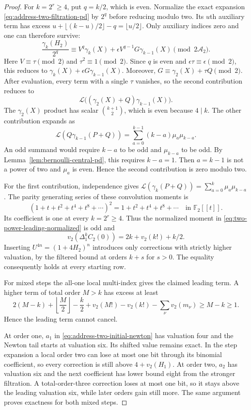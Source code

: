 \begin{proof}
For $k=2^r\geq4$, put $q=k/2$, which is even. Normalize the exact
expansion \eqref{eq:address-two-filtration-pd} by $2^q$ before reducing
modulo two. Its $u$th auxiliary term has excess
$u+\lfloor(k-u)/2\rfloor-q=\lfloor u/2\rfloor$.
Only auxiliary indices zero and one can therefore survive:
\begin{equation}
 \frac{\gamma_k(H_2)}{2^q}
 \equiv V^q\gamma_k(X)
       +\epsilon V^{q-1}G\gamma_{k-1}(X)
                                \pmod{2\mathcal A_2}.
 \label{eq:two-power-leading-normalized}
\end{equation}
Here $V\equiv\tau\pmod2$ and $\tau^2\equiv1\pmod2$.
Since $q$ is even and $\epsilon\tau\equiv\epsilon\pmod2$, this reduces
to $\gamma_k(X)+\epsilon G\gamma_{k-1}(X)$.
Moreover, $G\equiv\gamma_2(X)+\tau Q\pmod2$.
After evaluation, every term with a single $\tau$ vanishes, so the
second contribution reduces to
\[
 \mathcal L\bigl((\gamma_2(X)+Q)\gamma_{k-1}(X)\bigr).
\]
The $\gamma_2(X)$ product has scalar $\binom{k+1}{2}$, which is even
because $4\mid k$. The other contribution expands as
\begin{equation}
 \mathcal L(Q\gamma_{k-1}(P+Q))
    =\sum_{a=0}^{k-1}(k-a)\mu_a\mu_{k-a}.
 \label{eq:two-power-Q-evaluation}
\end{equation}
An odd summand would require $k-a$ to be odd and $\mu_{k-a}$ to be
odd. By Lemma~\ref{lem:bernoulli-central-pd}, this requires $k-a=1$.
Then $a=k-1$ is not a power of two and $\mu_a$ is even. Hence the
second contribution is zero modulo two.

For the first contribution, independence gives
$\mathcal L(\gamma_k(P+Q))=\sum_{a=0}^k\mu_a\mu_{k-a}$.
The parity generating series of these convolution moments is
\[
 (1+t+t^2+t^4+t^8+\cdots)^2
        =1+t^2+t^4+t^8+\cdots\quad\text{in }\mathbb F_2[[t]].
\]
Its coefficient is one at every $k=2^r\geq4$. Thus the normalized
moment in \eqref{eq:two-power-leading-normalized} is odd and
\[
 v_2(\Delta_1^kC_2(0))=2k+v_2(k!)+k/2.
\]
Inserting $U^{4n}=(1+4H_2)^n$ introduces only corrections with strictly
higher valuation, by the filtered bound at orders $k+s$ for $s>0$.
The equality consequently holds at every starting row.

For mixed steps the all-one local multi-index gives the claimed leading
term. A higher term of total order $M>k$ has excess at least
\[
 2(M-k)+\left\lfloor\frac M2\right\rfloor-\frac k2
       +v_2(M!)-v_2(k!)-\sum_\nu v_2(m_\nu)
       \geq M-k\geq1.
\]
Hence the leading term cannot cancel.

At order one, $a_1$ in \eqref{eq:address-two-initial-newton} has
valuation four and the Newton tail starts at valuation six. Its shifted
value remains exact. In the step expansion a local order two can lose
at most one bit through its binomial coefficient, so every correction
is still above $4+v_2(H_1)$. At order two, $a_2$ has valuation six and
the next coefficient has lower bound eight from the stronger
filtration. A total-order-three correction loses at most one bit,
so it stays above the leading valuation six, while later orders gain
still more. The same argument proves exactness for both mixed steps.
\end{proof}

